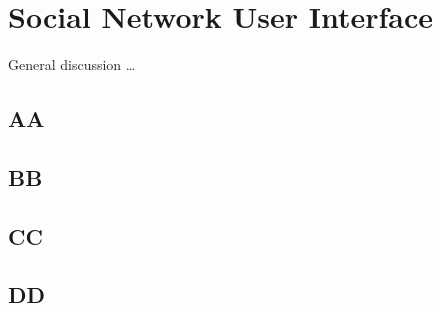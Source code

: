 \chapter{Social Network User Interface}

General discussion \ldots

\section{AA}

\section{BB}

\section{CC}

\section{DD}
